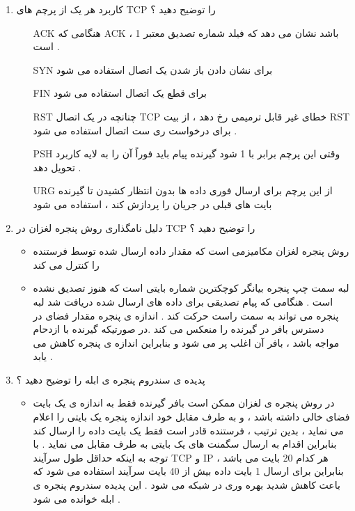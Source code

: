 \documentclass{article}
\begin{document}
\begin{enumerate}
\item کاربرد هر یک از پرچم های TCP را توضیح دهید ؟

\begin{tcolorbox}
\begin{itemize}
	\item [ACK] هنگامی که
	ACK
، 	1 باشد نشان می دهد که فیلد شماره تصدیق معتبر است .
	\item [SYN] برای نشان دادن باز شدن یک اتصال استفاده می شود
	\item [FIN] برای قطع یک اتصال استفاده می شود
	\item [RST] چنانچه در یک اتصال
	TCP
	خطای غیر قابل ترمیمی رخ دهد ، از بیت RST
	برای درخواست ری ست اتصال استفاده می شود .
	\item [PSH] وقتی این پرچم برابر با 1 شود
	گیرنده پیام باید فوراً آن را به لایه کاربرد تحویل دهد .
	\item [URG] از این پرچم برای ارسال فوری داده ها بدون انتظار کشیدن تا گیرنده بایت های قبلی در جریان را پردازش کند ، استفاده می شود 
\end{itemize}
\end{tcolorbox}

\item دلیل نامگذاری روش پنجره لغزان در TCP را توضیح دهید ؟

\begin{tcolorbox}
\begin{itemize}
	\item روش پنجره لغزان مکامیزمی است
	که مقدار داده ارسال شده توسط فرستنده را کنترل می کند
	\item لبه سمت چپ پنجره بیانگر کوچکترین شماره بایتی است که هنوز تصدیق نشده است . هنگامی که پیام تصدیقی برای داده های ارسال شده دریافت شد لبه پنجره می تواند به سمت راست حرکت کند . اندازه ی پنجره مقدار فضای در دسترس بافر در گیرنده را منعکس می کند .در صورتیکه گیرنده با ازدحام مواجه باشد ، بافر آن اغلب  پر می شود و بنابراین اندازه ی پنجره کاهش می یابد .
\end{itemize}
\end{tcolorbox}



\newpage

\item پدیده ی سندروم پنجره ی ابله را توضیح دهید ؟

\begin{tcolorbox}
\begin{itemize}
	\item در روش پنجره ی لغزان
	ممکن است بافر گیرنده فقط به اندازه ی یک بایت فضای خالی داشته باشد ، و به طرف مقابل خود اندازه پنجره یک بایتی را اعلام می نماید ، بدین ترتیب ، فرستنده قادر است فقط یک بایت داده را ارسال کند بنابراین اقدام به ارسال سگمنت های یک بایتی به طرف مقابل می نماید .
	با توجه به اینکه حداقل طول سرآیند TCP و IP هر کدام 20 بایت می باشد ، بنابراین برای ارسال 1 بایت داده بیش از 40 بایت سرآیند استفاده می شود که باعث کاهش شدید بهره وری در شبکه می شود . این پدیده سندروم پنجره ی ابله خوانده می شود .
\end{itemize}
\end{tcolorbox}


\end{enumerate}
\end{document}

